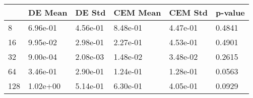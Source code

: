 \begin{tabular}{llllll}
\toprule
{} &   DE Mean &    DE Std &  CEM Mean &   CEM Std & p-value \\
\midrule
8   &  6.96e-01 &  4.56e-01 &  8.48e-01 &  4.47e-01 &  0.4841 \\
16  &  9.95e-02 &  2.98e-01 &  2.27e-01 &  4.53e-01 &  0.4901 \\
32  &  9.00e-04 &  2.08e-03 &  1.48e-02 &  3.48e-02 &  0.2615 \\
64  &  3.46e-01 &  2.90e-01 &  1.24e-01 &  1.28e-01 &  0.0563 \\
128 &  1.02e+00 &  5.14e-01 &  6.30e-01 &  4.05e-01 &  0.0929 \\
\bottomrule
\end{tabular}
